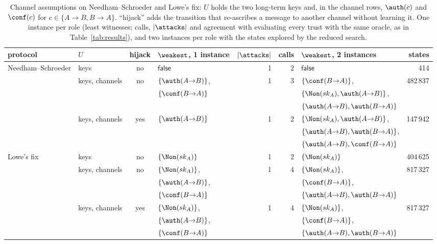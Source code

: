 \begin{table}[tbp]
\caption{Channel assumptions on Needham--Schroeder and Lowe's fix: $U$ holds the two long-term keys and, in the channel rows, $\auth(c)$ and $\conf(c)$ for $c \in \{A{\to}B, B{\to}A\}$. ``hijack'' adds the transition that re-ascribes a message to another channel without learning it. One instance per role (least witnesses; calls, $|\attacks|$ and agreement with evaluating every trust with the same oracle, as in Table~\ref{tab:results}), and two instances per role with the states explored by the reduced search.}
\label{tab:channels}
\centering
\setlength{\tabcolsep}{3pt}
\footnotesize
\begin{tabular}{l l c l r r l r}
\toprule
protocol & $U$ & hijack & $\weakest$, 1 instance & $|\attacks|$ & calls & $\weakest$, 2 instances & states\\
\midrule
Needham--Schroeder & keys & no & $\mathsf{false}$ & 1 & 2 & $\mathsf{false}$ & 414\\
 & keys, channels & no & $\{\auth(A{\to}B)\}$, & 1 & 3 & $\{\conf(B{\to}A)\}$, & 482\,837\\
 & & & $\{\conf(B{\to}A)\}$ & & & $\{\Non(sk_A), \auth(A{\to}B)\}$, & \\
 & & &  & & & $\{\auth(A{\to}B), \auth(B{\to}A)\}$ & \\
 & keys, channels & yes & $\{\auth(A{\to}B)\}$ & 1 & 2 & $\{\Non(sk_A), \auth(A{\to}B)\}$, & 147\,942\\
 & & &  & & & $\{\auth(A{\to}B), \auth(B{\to}A)\}$, & \\
 & & &  & & & $\{\auth(A{\to}B), \conf(B{\to}A)\}$ & \\
\midrule
Lowe's fix & keys & no & $\{\Non(sk_A)\}$ & 1 & 2 & $\{\Non(sk_A)\}$ & 404\,625\\
 & keys, channels & no & $\{\Non(sk_A)\}$, & 1 & 4 & $\{\Non(sk_A)\}$, & 817\,327\\
 & & & $\{\auth(A{\to}B)\}$, & & & $\{\conf(B{\to}A)\}$, & \\
 & & & $\{\conf(B{\to}A)\}$ & & & $\{\auth(A{\to}B), \auth(B{\to}A)\}$ & \\
 & keys, channels & yes & $\{\Non(sk_A)\}$, & 1 & 4 & $\{\Non(sk_A)\}$, & 817\,327\\
 & & & $\{\auth(A{\to}B)\}$, & & & $\{\conf(B{\to}A)\}$, & \\
 & & & $\{\conf(B{\to}A)\}$ & & & $\{\auth(A{\to}B), \auth(B{\to}A)\}$ & \\
\bottomrule
\end{tabular}
\end{table}
